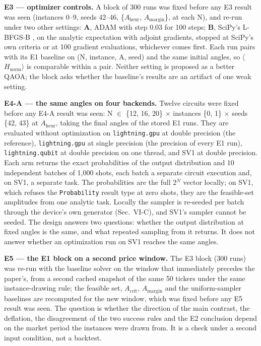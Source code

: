 \documentclass[journal]{IEEEtran}
\begin{document}
\textbf{E3 --- optimizer controls.} A block of 300 runs was fixed before any E3 result was seen (instances 0--9, seeds 42--46, \{$A_{\mathrm{heur}}$, $A_{\mathrm{margin}}$\}, at each N), and re-run under two other settings: \textbf{A}, ADAM with step 0.03 for 100 steps; \textbf{B}, SciPy's L-BFGS-B \cite{ref46}, \cite{ref47} on the analytic expectation with adjoint gradients, stopped at SciPy's own criteria or at 100 gradient evaluations, whichever comes first. Each run pairs with its E1 baseline on (N, instance, A, seed) and the same initial angles, so $\langle$$H_{\mathrm{norm}}$$\rangle$ is comparable within a pair. Neither setting is proposed as a better QAOA; the block asks whether the baseline's results are an artifact of one weak setting.


\textbf{E4-A --- the same angles on four backends.} Twelve circuits were fixed before any E4-A result was seen: N $\in$ \{12, 16, 20\} $\times$ instances \{0, 1\} $\times$ seeds \{42, 43\} at $A_{\mathrm{heur}}$, taking the final angles of the stored E1 runs. They are evaluated without optimization on \texttt{lightning.gpu} at double precision (the reference), \texttt{lightning.gpu} at single precision (the precision of every E1 run), \texttt{lightning.qubit} at double precision on one thread, and SV1 at double precision. Each arm returns the exact probabilities of the output distribution and 10 independent batches of 1,000 shots, each batch a separate circuit execution and, on SV1, a separate task. The probabilities are the full 2$^{N}$ vector locally; on SV1, which refuses the \texttt{Probability} result type at zero shots, they are the feasible-set amplitudes from one analytic task. Locally the sampler is re-seeded per batch through the device's own generator (Sec.~VI-C), and SV1's sampler cannot be seeded. The design answers two questions: whether the output distribution at fixed angles is the same, and what repeated sampling from it returns. It does not answer whether an optimization run on SV1 reaches the same angles.


\textbf{E5 --- the E1 block on a second price window.} The E3 block (300 runs) was re-run with the baseline solver on the window that immediately precedes the paper's, from a second cached snapshot of the same 50 tickers under the same instance-drawing rule; the feasible set, $A_{\mathrm{crit}}$, $A_{\mathrm{margin}}$ and the uniform-sampler baselines are recomputed for the new window, which was fixed before any E5 result was seen. The question is whether the direction of the main contrast, the deflation, the disagreement of the two success rules and the E2 conclusion depend on the market period the instances were drawn from. It is a check under a second input condition, not a backtest.
\end{document}
